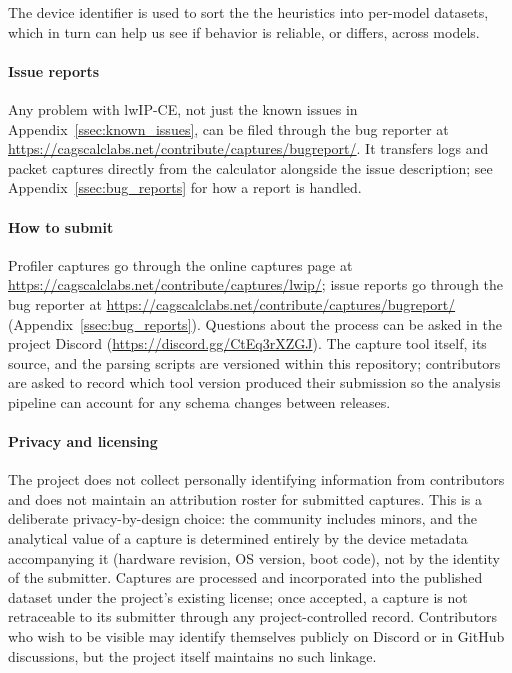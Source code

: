 \documentclass[titlepage]{report}
\begin{document}
	The device identifier is used to sort the the heuristics into per-model datasets, which in turn can help us see if behavior is reliable, or differs, across models.

	\paragraph{Issue reports}\label{par:issue_tracebacks}
	Any problem with lwIP-CE, not just the known issues in Appendix~\ref{ssec:known_issues}, can be filed through the bug reporter at \url{https://cagscalclabs.net/contribute/captures/bugreport/}. It transfers logs and packet captures directly from the calculator alongside the issue description; see Appendix~\ref{ssec:bug_reports} for how a report is handled.

	\paragraph{How to submit}
	Profiler captures go through the online captures page at \url{https://cagscalclabs.net/contribute/captures/lwip/}; issue reports go through the bug reporter at \url{https://cagscalclabs.net/contribute/captures/bugreport/} (Appendix~\ref{ssec:bug_reports}). Questions about the process can be asked in the project Discord (\url{https://discord.gg/CtEq3rXZGJ}).
	The capture tool itself, its source, and the parsing scripts are versioned within this repository; contributors are asked to record which tool version produced their submission so the analysis pipeline can account for any schema changes between releases.

	\paragraph{Privacy and licensing}
	The project does not collect personally identifying information from contributors and does not maintain an attribution roster for submitted captures. This is a deliberate privacy-by-design choice: the community includes minors, and the analytical value of a capture is determined entirely by the device metadata accompanying it (hardware revision, OS version, boot code), not by the identity of the submitter. Captures are processed and incorporated into the published dataset under the project's existing license; once accepted, a capture is not retraceable to its submitter through any project-controlled record. Contributors who wish to be visible may identify themselves publicly on Discord or in GitHub discussions, but the project itself maintains no such linkage.
\end{document}
